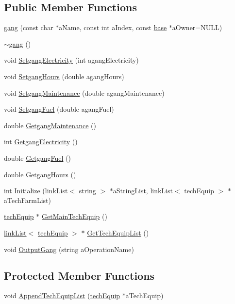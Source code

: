 \subsection*{Public Member Functions}
\begin{DoxyCompactItemize}
\item 
\hyperlink{classgang_aa992d6dc400e7d4d5b0b8b38f92d97de}{gang} (const char $\ast$aName, const int aIndex, const \hyperlink{classbase}{base} $\ast$aOwner=NULL)
\item 
\hyperlink{classgang_af922aa6f04ccfb6357dd2037ec1ff928}{$\sim$gang} ()
\item 
void \hyperlink{classgang_aca944833959e462beb2801d5b273a7b9}{SetgangElectricity} (int agangElectricity)
\item 
void \hyperlink{classgang_a40c3667685b17ddae65b055982ab3b27}{SetgangHours} (double agangHours)
\item 
void \hyperlink{classgang_a60d3a0bae152f5da29c7d71f4be9d568}{SetgangMaintenance} (double agangMaintenance)
\item 
void \hyperlink{classgang_a698911d3a759dda027bb1d4bcce89efb}{SetgangFuel} (double agangFuel)
\item 
double \hyperlink{classgang_a1d704760d4f83677e6214af6a9c79641}{GetgangMaintenance} ()
\item 
int \hyperlink{classgang_aed0d1e381d8520daab677912f58bf85e}{GetgangElectricity} ()
\item 
double \hyperlink{classgang_a30f188627195f0f90350619d64d250bf}{GetgangFuel} ()
\item 
double \hyperlink{classgang_a153812d5d4b4264d6dfb4d1c79e8c32f}{GetgangHours} ()
\item 
int \hyperlink{classgang_adbf1bed16c842b8ee84bdbfe03eba946}{Initialize} (\hyperlink{classlink_list}{linkList}$<$ string $>$ $\ast$aStringList, \hyperlink{classlink_list}{linkList}$<$ \hyperlink{classtech_equip}{techEquip} $>$ $\ast$aTechFarmList)
\item 
\hyperlink{classtech_equip}{techEquip} $\ast$ \hyperlink{classgang_ae69e199073ca33ab13840f5009e3ba5e}{GetMainTechEquip} ()
\item 
\hyperlink{classlink_list}{linkList}$<$ \hyperlink{classtech_equip}{techEquip} $>$ $\ast$ \hyperlink{classgang_ae3744dbd5a9cd0a5ad109317b3f1e339}{GetTechEquipList} ()
\item 
void \hyperlink{classgang_a3d919f05f8cd6c73a64aa7a6de067870}{OutputGang} (string aOperationName)
\end{DoxyCompactItemize}
\subsection*{Protected Member Functions}
\begin{DoxyCompactItemize}
\item 
void \hyperlink{classgang_a458435f79e861ed5bbe4315636557000}{AppendTechEquipList} (\hyperlink{classtech_equip}{techEquip} $\ast$aTechEquip)
\end{DoxyCompactItemize}
